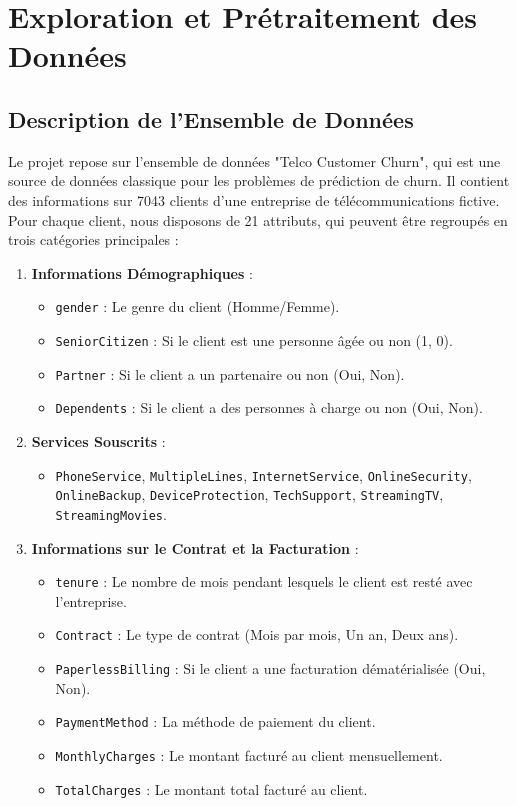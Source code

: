 \chapter{Exploration et Prétraitement des Données}
\minitoc

\section{Description de l'Ensemble de Données}
Le projet repose sur l'ensemble de données "Telco Customer Churn", qui est une source de données classique pour les problèmes de prédiction de churn. Il contient des informations sur 7043 clients d'une entreprise de télécommunications fictive. Pour chaque client, nous disposons de 21 attributs, qui peuvent être regroupés en trois catégories principales :

\begin{enumerate}
    \item \textbf{Informations Démographiques} :
    \begin{itemize}
        \item \texttt{gender} : Le genre du client (Homme/Femme).
        \item \texttt{SeniorCitizen} : Si le client est une personne âgée ou non (1, 0).
        \item \texttt{Partner} : Si le client a un partenaire ou non (Oui, Non).
        \item \texttt{Dependents} : Si le client a des personnes à charge ou non (Oui, Non).
    \end{itemize}

    \item \textbf{Services Souscrits} :
    \begin{itemize}
        \item \texttt{PhoneService}, \texttt{MultipleLines}, \texttt{InternetService}, \texttt{OnlineSecurity}, \texttt{OnlineBackup}, \texttt{DeviceProtection}, \texttt{TechSupport}, \texttt{StreamingTV}, \texttt{StreamingMovies}.
    \end{itemize}

    \item \textbf{Informations sur le Contrat et la Facturation} :
    \begin{itemize}
        \item \texttt{tenure} : Le nombre de mois pendant lesquels le client est resté avec l'entreprise.
        \item \texttt{Contract} : Le type de contrat (Mois par mois, Un an, Deux ans).
        \item \texttt{PaperlessBilling} : Si le client a une facturation dématérialisée (Oui, Non).
        \item \texttt{PaymentMethod} : La méthode de paiement du client.
        \item \texttt{MonthlyCharges} : Le montant facturé au client mensuellement.
        \item \texttt{TotalCharges} : Le montant total facturé au client.
    \end{itemize}
\end{enumerate}

